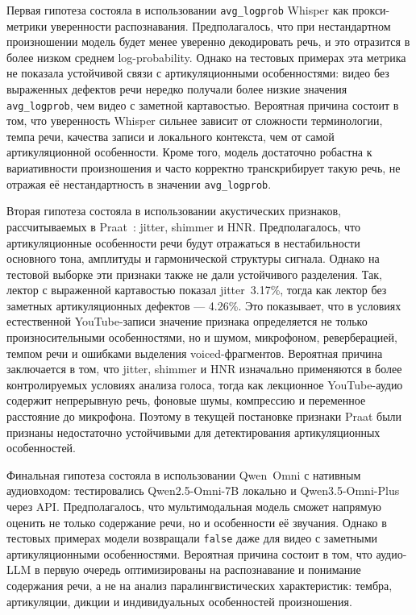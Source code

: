 Первая гипотеза состояла в использовании \texttt{avg\_logprob} Whisper как прокси-метрики уверенности распознавания.
Предполагалось, что при нестандартном произношении модель будет менее уверенно декодировать речь, и это отразится в более низком среднем log-probability.
Однако на тестовых примерах эта метрика не показала устойчивой связи с артикуляционными особенностями:
видео без выраженных дефектов речи нередко получали более низкие значения \texttt{avg\_logprob}, чем видео с заметной картавостью.
Вероятная причина состоит в том, что уверенность Whisper сильнее зависит от сложности терминологии, темпа речи, качества записи и локального контекста,
чем от самой артикуляционной особенности.
Кроме того, модель достаточно робастна к вариативности произношения и часто корректно транскрибирует такую речь,
не отражая её нестандартность в значении \texttt{avg\_logprob}.

Вторая гипотеза состояла в использовании акустических признаков, рассчитываемых в Praat~\cite{boersma2001praat}: jitter, shimmer и HNR.
Предполагалось, что артикуляционные особенности речи будут отражаться в нестабильности основного тона, амплитуды и гармонической структуры сигнала.
Однако на тестовой выборке эти признаки также не дали устойчивого разделения.
Так, лектор с выраженной картавостью показал jitter~3.17\%, тогда как лектор без заметных артикуляционных дефектов — 4.26\%.
Это показывает, что в условиях естественной YouTube-записи значение признака определяется не только произносительными особенностями,
но и шумом, микрофоном, реверберацией, темпом речи и ошибками выделения voiced-фрагментов.
Вероятная причина заключается в том, что jitter, shimmer и HNR изначально применяются в более контролируемых условиях анализа голоса,
тогда как лекционное YouTube-аудио содержит непрерывную речь, фоновые шумы, компрессию и переменное расстояние до микрофона.
Поэтому в текущей постановке признаки Praat были признаны недостаточно устойчивыми для детектирования артикуляционных особенностей.

Финальная гипотеза состояла в использовании Qwen~Omni с нативным аудиовходом:
тестировались Qwen2.5-Omni-7B локально и Qwen3.5-Omni-Plus через API.
Предполагалось, что мультимодальная модель сможет напрямую оценить не только содержание речи,
но и особенности её звучания.
Однако в тестовых примерах модели возвращали \texttt{false} даже для видео
с заметными артикуляционными особенностями.
Вероятная причина состоит в том, что аудио-LLM в первую очередь оптимизированы
на распознавание и понимание содержания речи, а не на анализ паралингвистических характеристик:
тембра, артикуляции, дикции и индивидуальных особенностей произношения.

